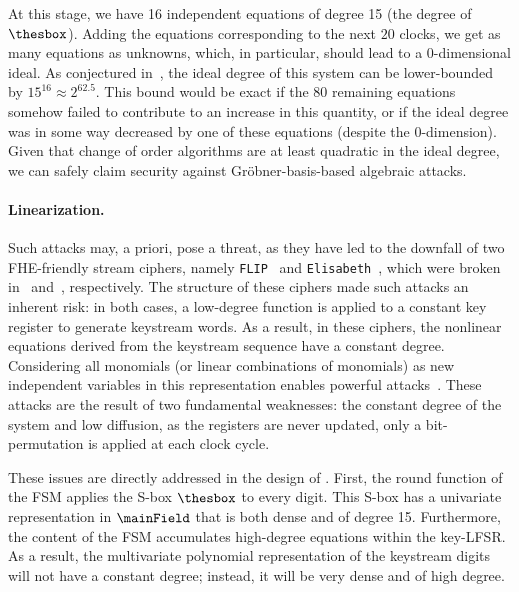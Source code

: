 At this stage, we have 16 independent equations of degree 15 (the degree of $\thesbox$). Adding the equations corresponding to the next $20$ clocks, we get as many equations as unknowns, which, in particular, should lead to a 0-dimensional ideal. As conjectured in~\cite{EPRINT:Perrin24}, the ideal degree of this system can be lower-bounded by $15^{16} \approx 2^{62.5}$. This bound would be exact if the 80 remaining equations somehow failed to contribute to an increase in this quantity, or if the ideal degree was in some way decreased by one of these equations (despite the 0-dimension). Given that change of order algorithms are at least quadratic in the ideal degree, we can safely claim security against Gröbner-basis-based algebraic attacks.



\paragraph{Linearization.}Such attacks may, a priori, pose a threat, as they have led to the downfall of two FHE-friendly stream ciphers, namely {\tt FLIP}~\cite{EC:MJSC16} and {\tt Elisabeth}~\cite{AC:CHMS22}, which were broken in~\cite{C:DuvLalRot16} and~\cite{AC:GBJR23}, respectively. The structure of these ciphers made such attacks an inherent risk: in both cases, a low-degree function is applied to a constant key register to generate keystream words.  As a result, in these ciphers, the nonlinear equations derived from the keystream sequence have a constant degree. Considering all monomials (or linear combinations of monomials) as new independent variables in this representation enables powerful attacks~\cite{C:DuvLalRot16,AC:GBJR23}. These attacks are the result of  two fundamental weaknesses: the constant degree of the system and low diffusion, as the registers are never updated, only a bit-permutation is applied at each clock cycle.

These issues are directly addressed in the design of \coolName{}. First, the round function of the FSM applies the S-box \( \thesbox \) to every digit. This S-box has a univariate representation in \( \mainField \) that is both dense and of degree 15. Furthermore, the content of the FSM accumulates high-degree equations within the key-LFSR. As a result, the multivariate polynomial representation of the keystream digits will not have a constant degree; instead, it will be very dense and of high degree.


